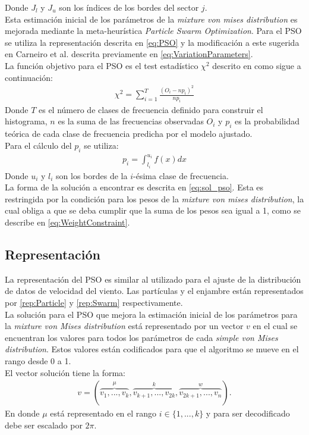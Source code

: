 Donde $J_l$ y $J_u$ son los índices de los bordes del sector $j$.\\
Esta estimación inicial de los parámetros de la \emph{mixture von mises distribution} es mejorada mediante la meta-heurística \emph{Particle Swarm Optimization}. Para el PSO se utiliza la representación descrita en \ref{eq:PSO} y la modificación a este sugerida en Carneiro et al. \cite{Carneiro15} descrita previamente en \ref{eq:VariationParameters}.\\
La función objetivo para el PSO es el test estadístico $\chi^2$ descrito en \cite{Heckenbergerova15} como sigue a continuación:
\begin{align}
    \chi^2 = \sum_{i=1}^{T}\frac{(O_i - np_{i})^2}{np_i}
\end{align}
Donde $T$ es el número de clases de frecuencia definido para construir el histograma, $n$ es la suma de las frecuencias observadas $O_i$ y $p_i$ es la probabilidad teórica de cada clase de frecuencia predicha por el modelo ajustado.\\
Para el cálculo del $p_i$ se utiliza:
\begin{align}
    p_i = \int_{l_i}^{u_i} f(x) dx
\end{align}
Donde $u_i$ y $l_i$ son los bordes de la $i$-ésima clase de frecuencia.\\
La forma de la solución a encontrar es descrita en \ref{eq:sol_pso}. Esta es restringida por la condición para los pesos de la \emph{mixture von mises distribution}, la cual obliga a que se deba cumplir que la suma de los pesos sea igual a 1, como se describe en \ref{eq:WeightConstraint}.
\subsection{Representación}
La representación del PSO es similar al utilizado para el ajuste de la distribución de datos de velocidad del viento. Las partículas y el enjambre están representados por \ref{rep:Particle} y \ref{rep:Swarm} respectivamente.\\
La solución para el PSO que mejora la estimación inicial de los parámetros para la \emph{mixture von Mises distribution} está representado por un vector $v$ en el cual se encuentran los valores para todos los parámetros de cada \emph{simple von Mises distribution}. Estos valores están codificados para que el algoritmo se mueve en el rango desde 0 a 1.\\
El vector solución tiene la forma:
\begin{align}
    v = (\overbrace{v_1,...,v_k}^{\mu},\overbrace{v_{k+1},...,v_{2k}}^{k},\overbrace{v_{2k+1},...,v_{n}}^{w}).
\end{align}
En donde $\mu$ está representado en el rango $i \in \{1,...,k\}$ y para ser decodificado debe ser escalado por $2\pi$.


